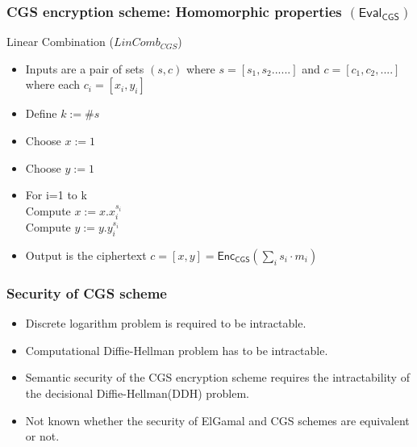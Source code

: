 \documentclass{beamer}
\begin{document}
\begin{frame}[t]
\frametitle{CGS encryption scheme: Homomorphic properties $(\mathsf{Eval_{CGS}})$}

\begin{block}{Linear Combination ($LinComb_{CGS}$)}
\begin{itemize}
\item Inputs are a pair of sets $(s,c)$ where $s=[s_1,s_2......]$ and $c=[c_1,c_2,....]$ where each $c_i=[x_i,y_i]$
\item Define $k:= \#s$
\item Choose $x := 1$
\item Choose $y := 1$
\item For {i=1 to k}\\
       Compute $ x :=x.x_i^{s_i} $\\
       Compute $ y :=y.y_i^{s_i} $
\item Output is the ciphertext $c=[x,y]=\mathsf{Enc_{CGS}}(\sum_i s_i \cdot m_i)$
\end{itemize} 
\end{block}
\end{frame}


\begin{frame}[t]
\frametitle{Security of CGS scheme}

\begin{itemize}
\item Discrete logarithm problem is required to be intractable.
\vspace*{3mm}
\item  Computational Diffie-Hellman problem has to be intractable.
\vspace*{3mm}
\item   Semantic security of the CGS encryption scheme requires the
intractability of the decisional Diffie-Hellman(DDH) problem.
\vspace*{3mm}
\item Not known whether the security of ElGamal and CGS schemes are equivalent or not.

\end{itemize}
\end{frame}
\end{document}
